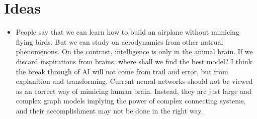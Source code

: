 \chapter{Ideas}
\begin{itemize}
	\item People say that we can learn how to build an airplane without mimicing flying birds. But we can study on aerodynamics from other natrual phenomenons. On the contrast, intelligence is only in the animal brain. If we discard inspirations from brains, where shall we find the best model? I think the break through of AI will not come from trail and error, but from explanition and transforming. Current neural networks should not be viewed as an correct way of mimicing human brain. Instead, they are just large and complex graph models implying the power of complex connecting systems, and their accomplishment may not be done in the right way.
\end{itemize}